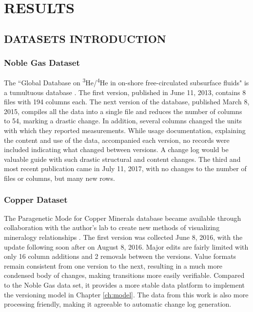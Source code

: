 
\chapter{RESULTS}\label{ch:implement}

\section{DATASETS INTRODUCTION}

\subsection{Noble Gas Dataset}

The ``Global Database on \textsuperscript{3}He/\textsuperscript{4}He in on-shore free-circulated subsurface fluids" is a tumultuous database \cite{Polyak2015}.
The first version, published in June 11, 2013, contains 8 files with 194 columns each.
The next version of the database, published March 8, 2015, compiles all the data into a single file and reduces the number of columns to 54, marking a drastic change.
In addition, several columns changed the units with which they reported measurements.
While usage documentation, explaining the content and use of the data, accompanied each version, no records were included indicating what changed between versions.
A change log would be valuable guide with such drastic structural and content changes.
The third and most recent publication came in July 11, 2017, with no changes to the number of files or columns, but many new rows.

\subsection{Copper Dataset}

The Paragenetic Mode for Copper Minerals database became available through collaboration with the author's lab to create new methods of visualizing mineralogy relationships \cite{Morrison2016}.
The first version was collected June 8, 2016, with the update following soon after on August 8, 2016.
Major edits are fairly limited with only 16 column additions and 2 removals between the versions.
Value formats remain consistent from one version to the next, resulting in a much more condensed body of changes, making transitions more easily verifiable.
Compared to the Noble Gas data set, it provides a more stable data platform to implement the versioning model in Chapter \ref{ch:model}.
The data from this work is also more processing friendly, making it agreeable to automatic change log generation.

